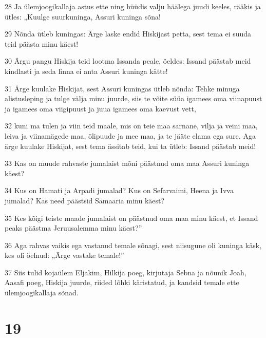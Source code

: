 \par 28 Ja ülemjoogikallaja astus ette ning hüüdis valju häälega juudi keeles, rääkis ja ütles: „Kuulge suurkuninga, Assuri kuninga sõna!
\par 29 Nõnda ütleb kuningas: Ärge laske endid Hiskijast petta, sest tema ei suuda teid päästa minu käest!
\par 30 Ärgu pangu Hiskija teid lootma Issanda peale, öeldes: Issand päästab meid kindlasti ja seda linna ei anta Assuri kuninga kätte!
\par 31 Ärge kuulake Hiskijat, sest Assuri kuningas ütleb nõnda: Tehke minuga alistusleping ja tulge välja minu juurde, siis te võite süüa igamees oma viinapuust ja igamees oma viigipuust ja juua igamees oma kaevust vett,
\par 32 kuni ma tulen ja viin teid maale, mis on teie maa sarnane, vilja ja veini maa, leiva ja viinamägede maa, õlipuude ja mee maa, ja te jääte elama ega sure. Aga ärge kuulake Hiskijat, sest tema ässitab teid, kui ta ütleb: Issand päästab meid!
\par 33 Kas on muude rahvaste jumalaist mõni päästnud oma maa Assuri kuninga käest?
\par 34 Kus on Hamati ja Arpadi jumalad? Kus on Sefarvaimi, Heena ja Ivva jumalad? Kas need päästsid Samaaria minu käest?
\par 35 Kes kõigi teiste maade jumalaist on päästnud oma maa minu käest, et Issand peaks päästma Jeruusalemma minu käest?”
\par 36 Aga rahvas vaikis ega vastanud temale sõnagi, sest niisugune oli kuninga käsk, kes oli öelnud: „Ärge vastake temale!”
\par 37 Siis tulid kojaülem Eljakim, Hilkija poeg, kirjutaja Sebna ja nõunik Joah, Aasafi poeg, Hiskija juurde, riided lõhki käristatud, ja kandsid temale ette ülemjoogikallaja sõnad.

\chapter{19}

